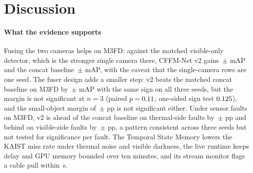 \section{Discussion}
\label{sec:discussion}
\paragraph{What the evidence supports}
Fusing the two cameras helps on M3FD: against the matched visible-only detector, which is the stronger single camera there, CFFM-Net v2 gains \gainMfdCffmVtwoOverBestMeanMap{}\,$\pm$\,\gainMfdCffmVtwoOverBestStdMap{}\,mAP and the concat baseline \gainMfdConcatMdOverBestMeanMap{}\,$\pm$\,\gainMfdConcatMdOverBestStdMap{}\,mAP, with the caveat that the single-camera rows are one seed. The fuser design adds a smaller step: v2 beats the matched concat baseline on M3FD by \marMfdVtwoVsConcatMdMeanMap{}\,$\pm$\,\marMfdVtwoVsConcatMdStdMap{}\,mAP with the same sign on all three seeds, but the margin is not significant at $n=3$ (paired $p=0.11{}$; one-sided sign test $0.125{}$), and the small-object margin of \marMfdVtwoVsConcatMdMeanApSmall{}\,$\pm$\,\marMfdVtwoVsConcatMdStdApSmall{}\,pp is not significant either. Under sensor faults on M3FD, v2 is ahead of the concat baseline on thermal-side faults by \fltMfdMarginMeanThermalAvgSevThreeMap{}\,$\pm$\,\fltMfdMarginStdThermalAvgSevThreeMap{}\,pp and behind on visible-side faults by \fltMfdMarginMeanVisibleAvgSevThreeMap{}\,$\pm$\,\fltMfdMarginStdVisibleAvgSevThreeMap{}\,pp, a pattern consistent across three seeds but not tested for significance per fault. The Temporal State Memory lowers the KAIST miss rate under thermal noise and visible darkness, the live runtime keeps delay and GPU memory bounded over ten minutes, and its stream monitor flags a cable pull within \livFaultOnUnpluggedDetectS{}\,s.

